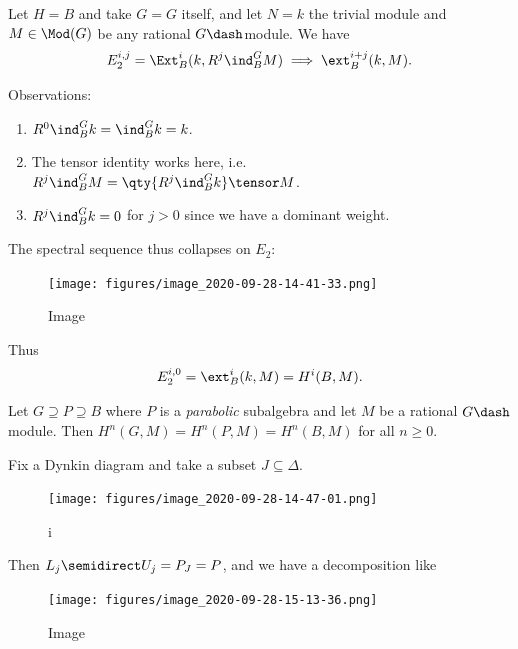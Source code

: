 \begin{example}

Let \(H=B\) and take \(G=G\) itself, and let \(N = k\) the trivial
module and \(M\in \Mod(G)\) be any rational \(G\dash\)module. We have
\begin{align*}  
E_2^{i, j} = \Ext^{i}_B(k, R^j \ind_B^G M) \implies \ext^{i+j}_B(k, M)
.\end{align*}

Observations:

\begin{enumerate}
\def\labelenumi{\arabic{enumi}.}
\setcounter{enumi}{-1}
\item
  \(R^0 \ind_B^G k = \ind_B^G k = k\).
\item
  The tensor identity works here,
  i.e.~\(R^j \ind_B^G M = \qty{R^j \ind_B^G k} \tensor M\).
\item
  \(R^j \ind_B^G k = 0\) for \(j> 0\) since we have a dominant weight.
\end{enumerate}

The spectral sequence thus collapses on \(E_2\):

\begin{figure}
\centering
\texttt{[image: figures/image\_2020-09-28-14-41-33.png]}
\caption{Image}
\end{figure}

Thus
\begin{align*}  
E_2^{i, 0} = \ext^i_B(k, M) = H^i(B, M)
.\end{align*}

\end{example}

\begin{corollary}[?]

Let \(G \supseteq P \supseteq B\) where \(P\) is a \emph{parabolic}
subalgebra and let \(M\) be a rational \(G\dash\)module. Then
\(H^n(G, M) = H^n(P, M) = H^n(B, M)\) for all \(n \geq 0\).

\end{corollary}

\begin{example}

Fix a Dynkin diagram and take a subset \(J\subseteq \Delta\).

\begin{figure}
\centering
\texttt{[image: figures/image\_2020-09-28-14-47-01.png]}
\caption{i}
\end{figure}

Then \(L_j\semidirect U_j = P_J = P\), and we have a decomposition like

\begin{figure}
\centering
\texttt{[image: figures/image\_2020-09-28-15-13-36.png]}
\caption{Image}
\end{figure}

\end{example}

